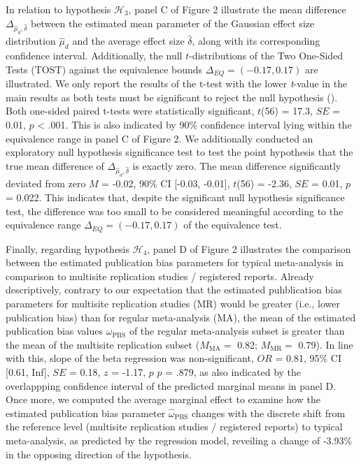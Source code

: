\documentclass[
  12pt,
]{scrartcl}
\newcommand{\pbs}{\omega_{\text{PBS}}}
\begin{document}
In relation to hypothesis \(\mathcal{H}_3\), panel C of Figure 2
illustrate the mean difference
\(\Delta_{\widehat{\mu}_d, \widehat{\delta}}\) between the estimated
mean parameter of the Gaussian effect size distribution
\(\widehat{\mu}_d\) and the average effect size \(\widehat{\delta}\),
along with its corresponding confidence interval. Additionally, the null
\(t\)-distributions of the Two One-Sided Tests (TOST) against the
equivalence bounds \(\Delta_{EQ}=(-0.17, 0.17)\) are illustrated. We
only report the results of the t-test with the lower \emph{t}-value in
the main results as both tests must be significant to reject the null
hypothesis (). Both
one-sided paired t-tests were statistically significant, \(t\)(56) =
17.3, \(SE\) = 0.01, \(p\) \textless{} .001. This is also indicated by
90\% confidence interval lying within the equivalence range in panel C
of Figure 2. We additionally conducted an exploratory null hypothesis
significance test to test the point hypothesis that the true mean
difference of \(\Delta_{\widehat{\mu}_d, \widehat{\delta}}\) is exactly
zero. The mean difference significantly deviated from zero \(M\) =
-0.02, 90\% CI {[}-0.03, -0.01{]}, \(t\)(56) = -2.36, \(SE\) = 0.01,
\(p\) = 0.022. This indicates that, despite the significant null
hypothesis significance test, the difference was too small to be
considered meaningful according to the equivalence range
\(\Delta_{EQ}=(-0.17, 0.17)\) of the equivalence test.

Finally, regarding hypothesis \(\mathcal{H}_4\), panel D of Figure 2
illustrates the comparison between the estimated publication bias
parameters for typical meta-analysis in comparison to multisite
replication studies / registered reports. Already descriptively,
contrary to our expectation that the estimated puhblication bias
parameters for multisite replication studies (MR) would be greater
(i.e., lower publication bias) than for regular meta-analysis (MA), the
mean of the estimated publication bias values \(\pbs\) of the regular
meta-analysis subset is greater than the mean of the multisite
replication subset (\(M_{\text{MA}}=\) 0.82; \(M_{\text{MR}}=\) 0.79).
In line with this, slope of the beta regression was non-significant,
\(OR\) = 0.81, 95\% CI {[}0.61, Inf{]}, \(SE\) = 0.18, \(z\) = -1.17,
\(p\) \(p\) = .879, as also indicated by the overlappping confidence
interval of the predicted marginal means in panel D. Once more, we
computed the average marginal effect to examine how the estimated
publication bias parameter \(\widehat{\omega}_{\text{PBS}}\) changes
with the discrete shift from the reference level (multisite replication
studies / registered reports) to typical meta-analysis, as predicted by
the regression model, reveiling a change of -3.93\% in the opposing
direction of the hypothesis.
\end{document}
